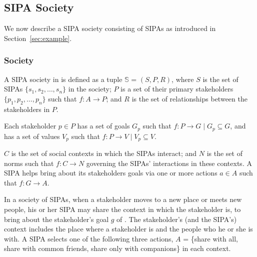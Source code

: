 \subsection{\frameworkAinur SIPA Society}
We now describe a SIPA society consisting of \locationapp SIPAs as introduced in Section~\ref{sec:example}. 

\subsubsection{Society} 

% 
A SIPA society in \frameworkAinur is defined as a tuple $\mathbb{S}$ = $(S, P, R)$, where 
$S$ is the set of SIPAs $\{s_1, s_2, \ldots, s_n\}$ in the society;  
$P$ is a set of their primary stakeholders $\{p_1, p_2, \ldots, p_n\}$ such that $f: A \rightarrow P$; and 
$R$ is the set of relationships between the stakeholders in $P$. 

Each stakeholder $p \in P$ has a set of goals $G_p$ such that $f: P \rightarrow G \mid G_p \subseteq G$, and
has a set of values $V_p$ such that $f: P \rightarrow V \mid V_p \subseteq V$. 

$C$ is the set of social contexts in which the SIPAs interact; 
and $N$ is the set of norms such that $f: C \rightarrow N$ governing the SIPAs' interactions in these contexts. 
A SIPA helps bring about its stakeholders goals via one or more actions $a \in A$ such that $f: G \rightarrow A$. 
% 

In a society of \locationapp SIPAs, when a stakeholder moves to a new place or meets new people, his or her SIPA may share the context in which the stakeholder is, to bring about the stakeholder's goal $g$ of . The stakeholder's (and the SIPA's) context includes the place where a stakeholder is and the people who he or she is with. 
A SIPA selects one of the following three actions, $A$ = \{share with all, share with common friends, share only with companions\} in each context. 

